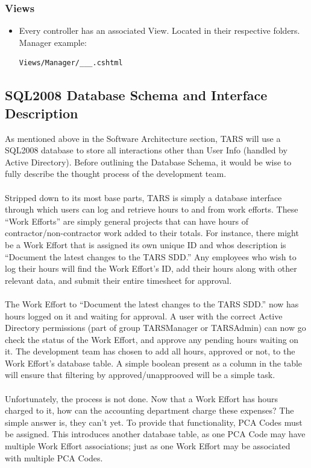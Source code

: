 \documentclass[letterpaper]{article}
\begin{document}
\subsubsection{Views}
\begin{itemize}
\item Every controller has an associated View. Located in their respective folders. Manager example:
\begin{verbatim}
Views/Manager/___.cshtml
\end{verbatim}
\end{itemize}
\subsection{SQL2008 Database Schema and Interface Description}
As mentioned above in the Software Architecture section, TARS will use a SQL2008 database to store all interactions other than User Info (handled by Active Directory). Before outlining the Database Schema, it would be wise to fully describe the thought process of the development team.\\
\\
Stripped down to its most base parts, TARS is simply a database interface through which users can log and retrieve hours to and from work efforts. These ``Work Efforts'' are simply general projects that can have hours of contractor/non-contractor work added to their totals. For instance, there might be a Work Effort that is assigned its own unique ID and whos description is ``Document the latest changes to the TARS SDD.'' Any employees who wish to log their hours will find the Work Effort's ID, add their hours along with other relevant data, and submit their entire timesheet for approval. \\
\\
The Work Effort to ``Document the latest changes to the TARS SDD.'' now has hours logged on it and waiting for approval. A user with the correct Active Directory permissions (part of group TARSManager or TARSAdmin) can now go check the status of the Work Effort, and approve any pending hours waiting on it. The development team has chosen to add all hours, approved or not, to the Work Effort's database table. A simple boolean present as a column in the table will ensure that filtering by approved/unapprooved will be a simple task.\\
\\
Unfortunately, the process is not done. Now that a Work Effort has hours charged to it, how can the accounting department charge these expenses? The simple answer is, they can't yet. To provide that functionality, PCA Codes must be assigned. This introduces another database table, as one PCA Code may have multiple Work Effort associations; just as one Work Effort may be associated with multiple PCA Codes.\\
\end{document}

